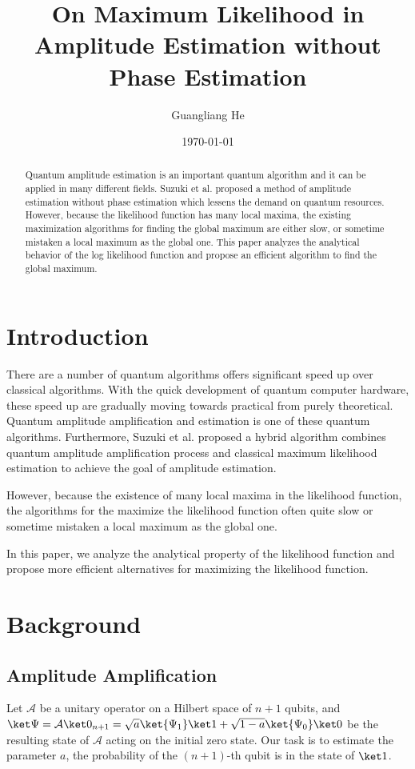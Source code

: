 \documentclass{article}
\title{On Maximum Likelihood in Amplitude Estimation without Phase Estimation}
\author{Guangliang He}
\date{\today}
\begin{document}
\maketitle

\begin{abstract}
  Quantum amplitude estimation is an important quantum algorithm
  and it can be applied in many different fields.  Suzuki et al.
  \cite{suzuki_2020} proposed a method of amplitude estimation
  without phase estimation which lessens the demand on quantum
  resources.  However, because the likelihood function has many
  local maxima, the existing maximization algorithms for finding
  the global maximum are either slow, or sometime mistaken a local
  maximum as the global one. This paper analyzes the analytical
  behavior of the log likelihood function and propose an efficient
  algorithm to find the global maximum.
\end{abstract}

\section{Introduction}
There are a number of quantum algorithms offers significant speed up
over classical algorithms.  With the quick development of quantum
computer hardware, these speed up are gradually moving towards
practical from purely theoretical. Quantum amplitude amplification
and estimation\cite{brassard_2002} is one of these quantum algorithms.
Furthermore, Suzuki et al.\cite{suzuki_2020} proposed a hybrid
algorithm combines quantum amplitude amplification process and
classical maximum likelihood estimation to achieve the goal of
amplitude estimation.

However, because the existence of many local maxima in the likelihood
function, the algorithms for the maximize the likelihood function
often quite slow or sometime mistaken a local maximum
as the global one\cite{qiskit_mlae, qiskit_aewoqft}.

In this paper, we analyze the analytical property of the likelihood
function and propose more efficient alternatives for maximizing the
likelihood function.

\section{Background}
\subsection{Amplitude Amplification}
Let $\mathcal A$ be a unitary operator on a Hilbert space of $n+1$
qubits, and $\ket\Psi = \mathcal A\ket0_{n+1}
= \sqrt{a}\ket{\Psi_1}\ket1 + \sqrt{1-a}\ket{\Psi_0}\ket0$ be
the resulting state of $\mathcal A$ acting on the initial zero state.
Our task is to estimate the parameter $a$, the probability of
the $(n+1)$-th qubit is in the state of $\ket1$.
\end{document}

